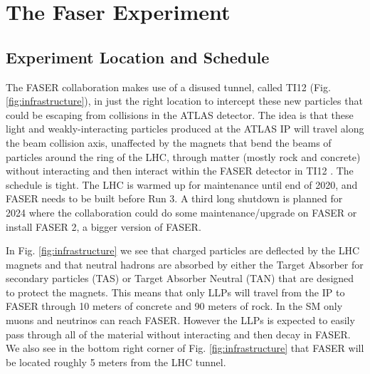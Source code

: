 \chapter{The Faser Experiment}

\ifpdf
    \graphicspath{{ChapterFaser/Figs/Raster/}{Chapter3/Figs/PDF/}{Chapter3/Figs/}}
\else
    \graphicspath{{ChapterFaser/Figs/Vector/}{Chapter3/Figs/}}
\fi


\section{Experiment Location and Schedule}


The FASER collaboration makes use of a disused tunnel, called TI12 (Fig. \ref{fig:infrastructure}), in just the right location to intercept these new particles that could be escaping from collisions in the ATLAS detector. The idea is that these light and weakly-interacting particles produced at the ATLAS IP will travel along the beam collision axis, unaffected by the magnets that bend the beams of particles around the ring of the LHC, through matter (mostly rock and concrete) without interacting and then interact within the FASER detector in TI12 \cite{faser_collaboration_faser_2019}. The schedule is tight. The LHC is warmed up for maintenance until end of 2020, and FASER needs to be built before Run 3. A third long shutdown is planned for 2024 where the collaboration could do some maintenance/upgrade on FASER or install FASER 2, a bigger version of FASER.

In Fig. \ref{fig:infrastructure} we see that charged particles are deflected by the LHC magnets and that neutral hadrons are absorbed by either the Target Absorber for secondary particles (TAS) or Target Absorber Neutral (TAN) that are designed to protect the magnets. This means that only LLPs will travel from the IP to FASER through 10 meters of concrete and 90 meters of rock. In the SM only muons and neutrinos can reach FASER. However the LLPs is expected to easily pass through all of the material without interacting and then decay in FASER. We also see in the bottom right corner of Fig. \ref{fig:infrastructure} that FASER will be located roughly 5 meters from the LHC tunnel.

